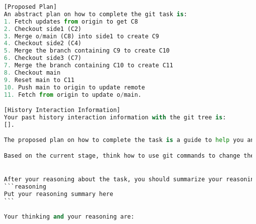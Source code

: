 \begin{lstlisting}[language=Python]
[Proposed Plan]
An abstract plan on how to complete the git task is:
1. Fetch updates from origin to get C8
2. Checkout side1 (C2)
3. Merge o/main (C8) into side1 to create C9
4. Checkout side2 (C4)
5. Merge the branch containing C9 to create C10
6. Checkout side3 (C7)
7. Merge the branch containing C10 to create C11
8. Checkout main
9. Reset main to C11
10. Push main to origin to update remote
11. Fetch from origin to update o/main.

[History Interaction Information]
Your past history interaction information with the git tree is:
[].

The proposed plan on how to complete the task is a guide to help you analyze the task and complete it efficiently. Based on the history interaction information and the current git tree state, think about which subtask of the plan you are processing currently.

Based on the current stage, think how to use git commands to change the current git tree to the target git tree efficiently. You need to propose specific git commands to complete the subtask.


After your reasoning about the task, you should summarize your reasoning(your summary must contain all key information) and output the summary result like
```reasoning
Put your reasoning summary here
```

Your thinking and your reasoning are:
    
\end{lstlisting}
